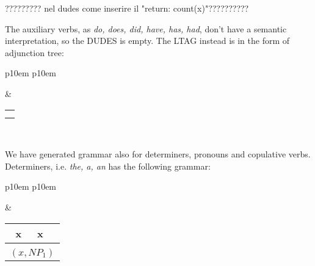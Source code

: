 ????????? nel dudes come inserire il "return: count(x)"??????????

The auxiliary verbs, as \textit{do, does, did, have, has, had}, don't have a semantic interpretation, so the DUDES is empty. The LTAG instead is in the form of adjunction tree:
\medskip
\begin{center}
\begin{tabular}{ p{10em} p{10em} }
	\label{tbl:grammar.do}
	
	\begin{center}
		\begin{tikzpicture}
		\Tree [.S  [.V do ] [.S$_2^\ast$ ]]
		\end{tikzpicture}
	\end{center}
	&
	\begin{center}
		\begin{tabular}{|c|l|}
			\hline
			\mbox{} & \mbox{}\\ 
			\hline
			\multicolumn{2}{|l|}{
				\mbox{}
			} \\
			\hline
			\multicolumn{2}{|l|}{
				\mbox{}
			} \\
			\hline
		\end{tabular}
	\end{center}	
	\\
\end{tabular}
\end{center}
\medskip

We have generated grammar also for determiners, pronouns and copulative verbs. Determiners, i.e. \textit{the, a, an} has the following grammar:
\medskip
\begin{center}
\begin{tabular}{ p{10em} p{10em} }
	\label{tbl:grammar.the}
	
	\begin{center}
		\begin{tikzpicture}
		\Tree [.DP  [.DET the ] [.NP$_1\downarrow$ ]]
		\end{tikzpicture}
	\end{center}
		
	&

	\begin{center}
		\begin{tabular}{|c|l|}
			\hline
			x & x\\ 
			\hline
			\multicolumn{2}{|l|}{
				\mbox{}
			} \\
			\hline
			\multicolumn{2}{|l|}{
				$(x,NP_{1})$
			} \\
			\hline
		\end{tabular}
	\end{center}	
	\\
\end{tabular}
\end{center}
\medskip

